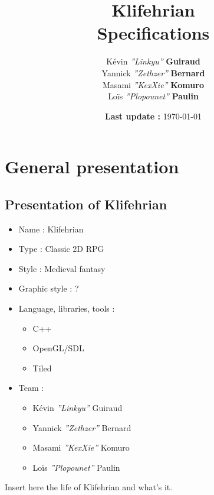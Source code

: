 \documentclass[a4paper,12pt]{book}
\title{\Huge{Klifehrian} \\ \large{Specifications}}
\author{K\'{e}vin \textit{''Linkyu''} \textbf{Guiraud} \\ Yannick \textit{''Zethzer''} \textbf{Bernard} \\ Masami \textit{''KexXie''} \textbf{Komuro} \\ Lo\"{i}s \textit{''Plopounet''} \textbf{Paulin}}
\date{\textbf{Last update :} \today}
\begin{document}
\maketitle
\thispagestyle{empty}
\setcounter{page}{0}
\part{General presentation}
\chapter{Presentation of Klifehrian}
\begin{itemize}
	\item Name : Klifehrian
	\item Type : Classic 2D RPG
	\item Style : Medieval fantasy
	\item Graphic style : ?
	\item Language, libraries, tools :
	\begin{itemize}
		\item C++
		\item OpenGL/SDL
		\item Tiled
	\end{itemize}
	\item Team :
	\begin{itemize}
		\item K\'{e}vin \textit{''Linkyu''} Guiraud
		\item Yannick \textit{''Zethzer''} Bernard
		\item Masami \textit{''KexXie''} Komuro
		\item Lo\"{i}s \textit{''Plopounet''} Paulin
	\end{itemize}
\end{itemize}
\newpage Insert here the life of Klifehrian and what's it.
\end{document}
